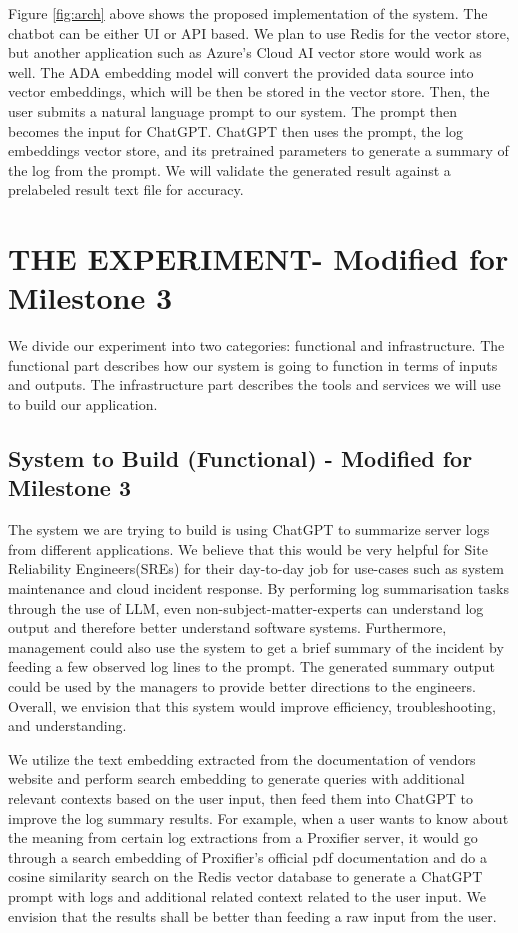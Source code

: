 \documentclass[conference]{IEEEtran}
\begin{document}
Figure \ref{fig:arch} above shows the proposed implementation of the system. The chatbot can be either UI or API based. We plan to use Redis for the vector store, but another application such as Azure's Cloud AI vector store would work as well. The ADA embedding model will convert the provided data source into vector embeddings, which will be then be stored in the vector store. Then, the user submits a natural language prompt to our system. The prompt then becomes the input for ChatGPT. ChatGPT then uses the prompt, the log embeddings vector store, and its pretrained parameters to generate a summary of the log from the prompt. We will validate the generated result against a prelabeled result text file for accuracy. 


\section{THE EXPERIMENT- Modified for Milestone 3}

We divide our experiment into two categories: functional and infrastructure. The functional part describes how our system is going to function in terms of inputs and outputs. The infrastructure part describes the tools and services we will use to build our application.

\subsection{System to Build (Functional) - Modified for Milestone 3}

The system we are trying to build is using ChatGPT to summarize server logs from different applications. We believe that this would be very helpful for Site Reliability Engineers(SREs) for their day-to-day job for use-cases such as system maintenance and cloud incident response. By performing log summarisation tasks through the use of LLM, even non-subject-matter-experts can understand log output and therefore better understand software systems. Furthermore, management could also use the system to get a brief summary of the incident by feeding a few observed log lines to the prompt. The generated summary output could be used by the managers to provide better directions to the engineers. Overall, we envision that this system would improve efficiency, troubleshooting, and understanding.

We utilize the text embedding extracted from the documentation of vendors website and perform search embedding to generate queries with additional relevant contexts based on the user input, then feed them into ChatGPT to improve the log summary results. For example, when a user wants to know about the meaning from certain log extractions from a Proxifier server, it would go through a search embedding of Proxifier's official pdf documentation and do a cosine similarity search on the Redis vector database to generate a ChatGPT prompt with logs and additional related context related to the user input. We envision that the results shall be better than feeding a raw input from the user.
\end{document}
